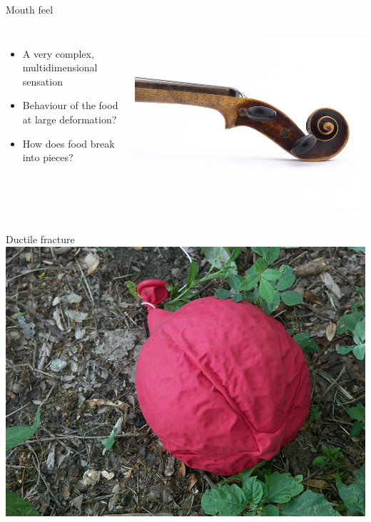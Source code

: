 \documentclass[xcolor=table]{beamer}
\begin{document}
\begin{frame}{Mouth feel}
\begin{columns}
\begin{itemize}
\item A very complex, multidimensional sensation
\item Behaviour of the food at large deformation?
\item How does food break into pieces?
\end{itemize}
\includegraphics[width=\textwidth]{violon}
\end{columns}

\bigskip
\begin{columns}[T]
\begin{block}{Ductile fracture}
\includegraphics[height=5\baselineskip]{deflated_balloon}


\end{block}
\end{columns}
\end{frame}
\end{document}
